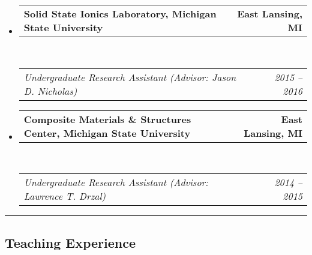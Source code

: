 \documentclass[10pt,letterpaper]{article}
\makeatletter
\newcommand{\headerrow}[2]
{\begin{tabular*}{\linewidth}{l@{\extracolsep{\fill}}r}
  #1 &
  #2 \\
\end{tabular*}}
\makeatother
\begin{document}
\begin{itemize}
  \item
  \headerrow
    {\textbf{Solid State Ionics Laboratory, Michigan State University}}
    {\textbf{East Lansing, MI}}
  \\
  \headerrow
    {\emph{Undergraduate Research Assistant (Advisor: Jason D. Nicholas)}}
    {\emph{2015 -- 2016}}

  \item
  \headerrow
    {\textbf{Composite Materials \& Structures Center, Michigan State University}}
    {\textbf{East Lansing, MI}}
  \\
  \headerrow
    {\emph{Undergraduate Research Assistant (Advisor: Lawrence T. Drzal)}}
    {\emph{2014 -- 2015}}

\end{itemize}

\hrule
\vspace{-0.6em}
\subsection*{Teaching Experience}
\end{document}
